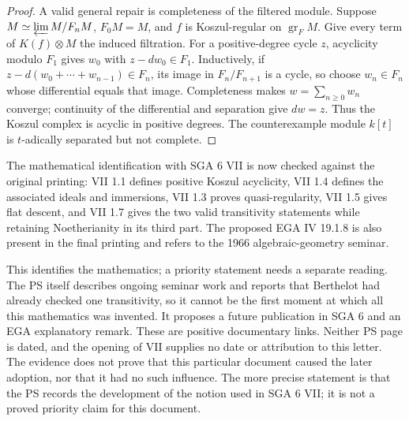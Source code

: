\begin{proof}
A valid general repair is completeness of the filtered module.
Suppose $M\simeq\varprojlim M/F_nM$, $F_0M=M$, and $f$ is
Koszul-regular on $\operatorname{gr}_F M$.  Give every term of
$K(f)\otimes M$ the induced filtration.  For a positive-degree
cycle $z$, acyclicity modulo $F_1$ gives $w_0$ with
$z-dw_0\in F_1$.  Inductively, if
$z-d(w_0+\cdots+w_{n-1})\in F_n$, its image in
$F_n/F_{n+1}$ is a cycle, so choose $w_n\in F_n$ whose
differential equals that image.  Completeness makes
$w=\sum_{n\geq0}w_n$ converge; continuity of the differential
and separation give $dw=z$.  Thus the Koszul complex is acyclic
in positive degrees.  The counterexample module $k[t]$ is
$t$-adically separated but not complete.
\end{proof}

\begin{remark}\label{SA23-C-10}
The mathematical identification with SGA 6 VII is now checked
against the original printing: VII 1.1 defines positive Koszul
acyclicity, VII 1.4 defines the associated ideals and immersions,
VII 1.3 proves quasi-regularity, VII 1.5 gives flat descent, and
VII 1.7 gives the two valid transitivity statements while retaining
Noetherianity in its third part.
\cite[VII 1.1--1.7, pp.~416--423]{algSGA6}
The proposed EGA IV 19.1.8 is also present in the final printing
and refers to the 1966 algebraic-geometry seminar.
\cite[IV 19.1.8, p.~189]{algEGAIV4}

This identifies the mathematics; a priority statement needs a
separate reading.  The PS itself describes ongoing seminar work
and reports that Berthelot had already checked one transitivity,
so it cannot be the first moment at which all this mathematics
was invented.  It proposes a future publication in SGA 6 and an
EGA explanatory remark.  These are positive documentary links.
\cite[physical PDF pp.~53--54]{algManuscript23}
Neither PS page is dated, and the opening of VII supplies no
date or attribution to this letter.  The evidence does not prove
that this particular document caused the later adoption, nor that
it had no such influence.  The more precise statement is that
the PS records the development of the notion used in SGA 6 VII;
it is not a proved priority claim for this document.
\end{remark}
